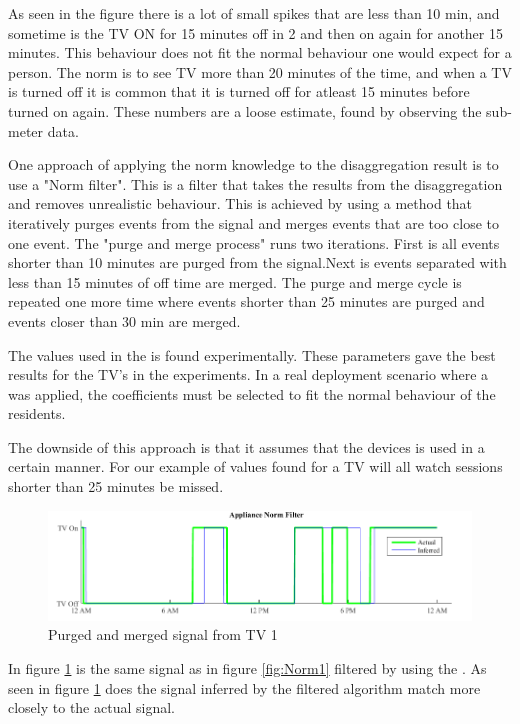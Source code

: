 As seen in the figure there is a lot of small spikes that are less than 10 min, and sometime is the TV ON for 15 minutes off in 2 and then on again for another 15 minutes. This behaviour does not fit the normal behaviour one would expect for a person. The norm is to see TV more than 20 minutes of the time, and when a TV is turned off it is common that it is turned off for atleast 15 minutes before turned on again. These numbers are a loose estimate, found by observing the sub-meter data. 


One approach of applying the norm knowledge to the disaggregation result is to use a "Norm filter". This is a filter that takes the results from the disaggregation and removes unrealistic behaviour. This is achieved by using a method that iteratively purges events from the signal and merges events that are too close to one event. The "purge and merge process" runs two iterations. First is all events shorter than 10 minutes are purged from the signal.Next is events separated with less than 15 minutes of off time are merged. The purge and merge cycle is repeated one more time where events shorter than 25 minutes are purged and events closer than 30 min are merged. 

The values used in the  is found experimentally. These parameters gave the best results for the TV's in the experiments. In a real deployment scenario where a  was applied, the coefficients must be selected to fit the normal behaviour of the residents.

The downside of this approach is that it assumes that the devices is used in a certain manner. For our example of values found for a TV will all watch sessions shorter than 25 minutes be missed.

\begin{figure}[H]
\centering
\includegraphics[width=1\textwidth]{billeder/AppNormFilterH10_2.png}
\caption{Purged and merged signal from TV 1}
\label{fig:Norm2}
\end{figure}

In figure \ref{fig:Norm2} is the same signal as in figure \ref{fig:Norm1} filtered by using the . As seen in figure \ref{fig:Norm2} does the signal inferred by the filtered  algorithm match more closely to the actual signal. 

